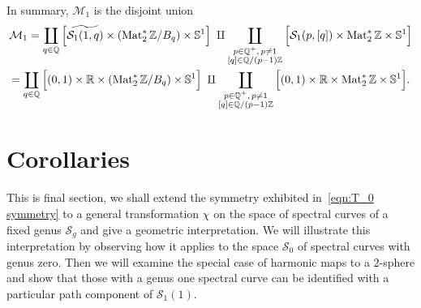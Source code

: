 \documentclass{article}
\begin{document}
In summary, $\mathcal{M}_1$ is the disjoint union
\begin{gather*}
\mathcal{M}_1
=
\coprod_{q \in \mathbb{Q}} \Big[ \widetilde{\mathcal{S}_1(1,q)} \times \left(\operatorname{Mat}_2^*\mathbb{Z} / B_q\right) \times \mathbb{S}^1 \Big]
\;\amalg
\coprod_{\substack{p \in \mathbb{Q}^+,\, p \neq 1\\ [q] \in \mathbb{Q}/(p-1)\mathbb{Z}}} \Big[ \mathcal{S}_1(p,[q]) \times \operatorname{Mat}_2^*\mathbb{Z} \times \mathbb{S}^1 \Big] \\
=
\coprod_{q \in \mathbb{Q}} \Big[ (0,1)\times\mathbb{R} \times \left(\operatorname{Mat}_2^*\mathbb{Z} / B_q\right) \times \mathbb{S}^1 \Big]
\;\amalg
\coprod_{\substack{p \in \mathbb{Q}^+,\, p \neq 1\\ [q] \in \mathbb{Q}/(p-1)\mathbb{Z}}}
\Big[ (0,1)\times\mathbb{R} \times \operatorname{Mat}_2^*\mathbb{Z} \times \mathbb{S}^1 \Big].
\end{gather*}











\section{Corollaries}\label{sec:Corollaries}

This is final section, we shall extend the symmetry exhibited in~\eqref{eqn:T_0 symmetry} to a general transformation $\chi$ on the space of spectral curves of a fixed genus $\mathcal{S}_g$ and give a geometric interpretation. We will illustrate this interpretation by observing how it applies to the space $\mathcal{S}_0$ of spectral curves with genus zero. 
Then we will examine the special case of harmonic maps to a $2$-sphere and show that those with a genus one spectral curve can be identified with a particular path component of $\mathcal{S}_1(1)$.
\end{document}

